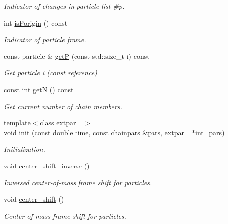 \begin{DoxyCompactItemize}
\begin{DoxyCompactList}\small\item\em Indicator of changes in particle list \#p. \end{DoxyCompactList}\item 
int \hyperlink{classARC_1_1chain_a7ced7404d896ed78a109868a10ee6b56}{is\+Porigin} () const
\begin{DoxyCompactList}\small\item\em Indicator of particle frame. \end{DoxyCompactList}\item 
const particle \& \hyperlink{classARC_1_1chain_ae6fa4b4a95b1caff98b55ebc5964e956}{getP} (const std\+::size\+\_\+t i) const
\begin{DoxyCompactList}\small\item\em Get particle i (const reference) \end{DoxyCompactList}\item 
const int \hyperlink{classARC_1_1chain_a6069646256b45896e6395205826ad05f}{getN} () const
\begin{DoxyCompactList}\small\item\em Get current number of chain members. \end{DoxyCompactList}\item 
{\footnotesize template$<$class extpar\+\_\+ $>$ }\\void \hyperlink{classARC_1_1chain_a9ddc18539223abcb6451805abc15aea9}{init} (const double time, const \hyperlink{classARC_1_1chainpars}{chainpars} \&pars, extpar\+\_\+ $\ast$int\+\_\+pars)
\begin{DoxyCompactList}\small\item\em Initialization. \end{DoxyCompactList}\item 
void \hyperlink{classARC_1_1chain_ab56fbddf27416cd640c535ec267cc4bc}{center\+\_\+shift\+\_\+inverse} ()
\begin{DoxyCompactList}\small\item\em Inversed center-\/of-\/mass frame shift for particles. \end{DoxyCompactList}\item 
void \hyperlink{classARC_1_1chain_a2abf3aad903a354f29764ad7c8142ab6}{center\+\_\+shift} ()
\begin{DoxyCompactList}\small\item\em Center-\/of-\/mass frame shift for particles. \end{DoxyCompactList}\item 

\end{DoxyCompactItemize}
